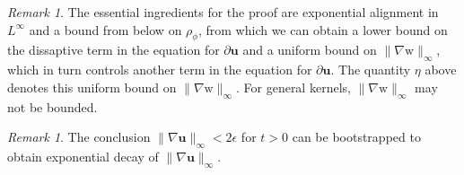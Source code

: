 \documentclass[11pt,letterpaper]{amsart}
\theoremstyle{plain}
\theoremstyle{definition}
\theoremstyle{remark}
\newtheorem{remark}[THEOREM]{Remark}
\def\u{\textbf{u}}
\def \wt {\mathrm{w}}
\begin{document}
\begin{remark}
    \label{remark:small_data}
    The essential ingredients for the proof are exponential alignment in $L^{\infty}$ and a bound from below on $\rho_{\phi}$, 
    from which we can obtain a lower bound on the dissaptive term in the equation for $\partial \u$ and a uniform bound on $\|\nabla \wt\|_{\infty}$, 
    which in turn controls another term in the equation for $\partial \u$.
    The quantity $\eta$ above denotes this uniform bound on $\|\nabla \wt\|_{\infty}$.
    For general kernels, $\|\nabla \wt\|_{\infty}$ may not be bounded. 
\end{remark}
\begin{remark}
    The conclusion $\|\nabla \u\|_{\infty} < 2 \epsilon$ for $t > 0$ can be bootstrapped to obtain exponential decay of $\|\nabla \u\|_{\infty}$. 
\end{remark}
\end{document}
